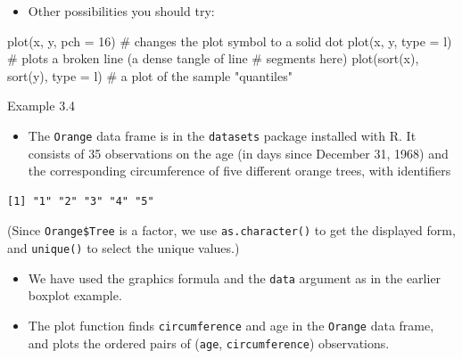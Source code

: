\documentclass[
  9pt,
  a4paper,
  ignorenonframetext,
  notheorems]{beamer}
\newenvironment{Shaded}{\begin{snugshade}}{\end{snugshade}}
\newcommand{\AttributeTok}[1]{\textcolor[rgb]{0.40,0.45,0.13}{#1}}
\newcommand{\CommentTok}[1]{\textcolor[rgb]{0.37,0.37,0.37}{#1}}
\newcommand{\DecValTok}[1]{\textcolor[rgb]{0.68,0.00,0.00}{#1}}
\newcommand{\FunctionTok}[1]{\textcolor[rgb]{0.28,0.35,0.67}{#1}}
\newcommand{\NormalTok}[1]{\textcolor[rgb]{0.00,0.23,0.31}{#1}}
\newcommand{\SpecialCharTok}[1]{\textcolor[rgb]{0.37,0.37,0.37}{#1}}
\newcommand{\StringTok}[1]{\textcolor[rgb]{0.13,0.47,0.30}{#1}}
\providecommand{\tightlist}{%
  \setlength{\itemsep}{0pt}\setlength{\parskip}{0pt}}\usepackage{longtable,booktabs,array}
\begin{document}
\begin{frame}[fragile]
\begin{itemize}
\tightlist
\item
  Other possibilities you should try:
\end{itemize}

\begin{Shaded}
\begin{Highlighting}[]
\FunctionTok{plot}\NormalTok{(x, y, }\AttributeTok{pch =} \DecValTok{16}\NormalTok{) }\CommentTok{\# changes the plot symbol to a solid dot }
\FunctionTok{plot}\NormalTok{(x, y, }\AttributeTok{type =} \StringTok{\textquotesingle{}l\textquotesingle{}}\NormalTok{) }\CommentTok{\# plots a broken line (a dense tangle of line}
                       \CommentTok{\# segments here)}
\FunctionTok{plot}\NormalTok{(}\FunctionTok{sort}\NormalTok{(x), }\FunctionTok{sort}\NormalTok{(y), }\AttributeTok{type =} \StringTok{\textquotesingle{}l\textquotesingle{}}\NormalTok{) }\CommentTok{\# a plot of the sample "quantiles"}
\end{Highlighting}
\end{Shaded}

\begin{block}{Example 3.4}
\protect\hypertarget{example-3.4}{}
\begin{itemize}
\tightlist
\item
  The \texttt{Orange} data frame is in the \texttt{datasets} package
  installed with R. It consists of 35 observations on the age (in days
  since December 31, 1968) and the corresponding circumference of five
  different orange trees, with identifiers
\end{itemize}

\begin{Shaded}
\end{Shaded}

\begin{verbatim}
[1] "1" "2" "3" "4" "5"
\end{verbatim}

(Since \texttt{Orange\$Tree} is a factor, we use \texttt{as.character()}
to get the displayed form, and \texttt{unique()} to select the unique
values.)

\begin{itemize}
\item
  We have used the graphics formula and the \texttt{data} argument as in
  the earlier boxplot example.
\item
  The plot function finds \texttt{circumference} and age in the
  \texttt{Orange} data frame, and plots the ordered pairs of
  (\texttt{age}, \texttt{circumference}) observations.
\end{itemize}
\end{block}
\end{frame}
\end{document}
